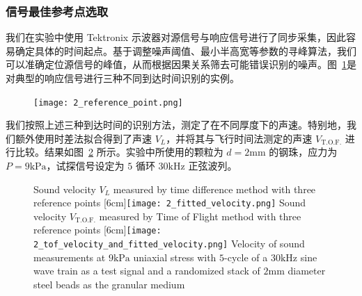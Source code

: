 \subsubsection{信号最佳参考点选取}

我们在实验中使用 Tektronix 示波器对源信号与响应信号进行了同步采集，因此容易确定具体的时间起点。基于调整噪声阈值、最小半高宽等参数的寻峰算法，我们可以准确定位源信号的峰值，从而根据因果关系筛去可能错误识别的噪声。图~\ref{fig:reference_point}是对典型的响应信号进行三种不同到达时间识别的实例。


\begin{figure}[!htp]
  \centering
  \texttt{[image: 2\_reference\_point.png]}
  \label{fig:reference_point}
\end{figure}

我们按照上述三种到达时间的识别方法，测定了在不同厚度下的声速。特别地，我们额外使用时差法拟合得到了声速 $V_{L}$，并将其与飞行时间法测定的声速 $V_{\text{T.O.F.}}$ 进行比较。结果如图~\ref{fig:sound_velocity_measurement} 所示。实验中所使用的颗粒为 $d=2\unit{\milli\meter}$ 的钢珠，应力为 $P=9\unit{\kilo\Pa}$，试探信号设定为 $5$ 循环 $30\unit{\kilo\Hz}$ 正弦波列。

\begin{figure}[!hbtp]
  \centering
                  {Sound velocity $V_{L}$ measured by time difference method with three reference points}%
                  [6cm]{\texttt{[image: 2\_fitted\_velocity.png]}}
  \hspace{1cm}
                  {Sound velocity $V_{\text{T.O.F.}}$ measured by Time of Flight method with three reference points}%
                  [6cm]{\texttt{[image: 2\_tof\_velocity\_and\_fitted\_velocity.png]}}
            {Velocity of sound measurements at $9\unit{\kilo\Pa}$ uniaxial stress with $5$-cycle of a $30\unit{\kilo\Hz}$ sine wave train as a test signal and a randomized stack of $2\unit{\milli\meter}$ diameter steel beads as the granular medium}
  \label{fig:sound_velocity_measurement}
\end{figure}



